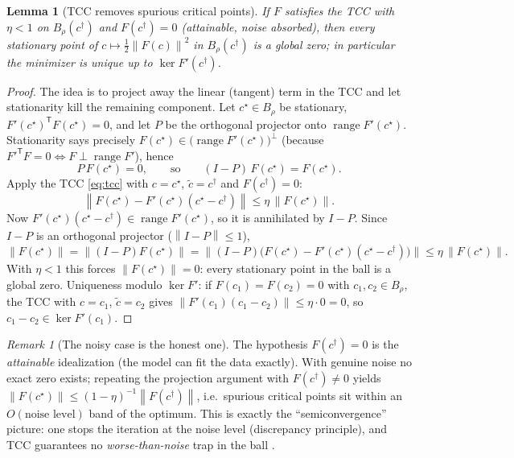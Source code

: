 \documentclass[11pt]{article}
\theoremstyle{plain}
\newtheorem{lemma}[theorem]{Lemma}
\theoremstyle{definition}
\theoremstyle{remark}
\newtheorem*{remark}{Remark}
\newcommand{\norm}[1]{\left\lVert#1\right\rVert}
\newcommand{\trc}{\mathsf{T}}
\begin{document}
\begin{lemma}[TCC removes spurious critical points]\label{lem:tcc}
If $F$ satisfies the TCC with $\eta<1$ on $B_\rho(c^\dagger)$ and
$F(c^\dagger)=0$ (attainable, noise absorbed), then every stationary
point of $c\mapsto\tfrac12\norm{F(c)}^{2}$ in $B_\rho(c^\dagger)$ is a
global zero; in particular the minimizer is unique up to
$\ker F'(c^\dagger)$.
\end{lemma}

\begin{proof}
The idea is to project away the linear (tangent) term in the TCC and let
stationarity kill the remaining component. Let $c^\star\in B_\rho$ be
stationary, $F'(c^\star)^{\trc}F(c^\star)=0$, and let $P$ be the
orthogonal projector onto $\operatorname{range}F'(c^\star)$. Stationarity
says precisely $F(c^\star)\in\big(\operatorname{range}F'(c^\star)\big)^{
\perp}$ (because $F'^{\trc}F=0\iff F\perp\operatorname{range}F'$), hence
\[
P\,F(c^\star)=0,\qquad\text{so}\qquad (I-P)\,F(c^\star)=F(c^\star).
\]
Apply the TCC \eqref{eq:tcc} with $c=c^\star$, $\tilde c=c^\dagger$ and
$F(c^\dagger)=0$:
\[
\norm{F(c^\star)-F'(c^\star)(c^\star-c^\dagger)}\le
\eta\,\norm{F(c^\star)} .
\]
Now $F'(c^\star)(c^\star-c^\dagger)\in\operatorname{range}F'(c^\star)$,
so it is annihilated by $I-P$. Since $I-P$ is an orthogonal projector
($\norm{I-P}\le1$),
\[
\norm{F(c^\star)}
=\norm{(I-P)F(c^\star)}
=\big\|(I-P)\big(F(c^\star)-F'(c^\star)(c^\star-c^\dagger)\big)\big\|
\le\eta\,\norm{F(c^\star)} .
\]
With $\eta<1$ this forces $\norm{F(c^\star)}=0$: every stationary point
in the ball is a global zero. Uniqueness modulo $\ker F'$: if
$F(c_1)=F(c_2)=0$ with $c_1,c_2\in B_\rho$, the TCC with $c=c_1$,
$\tilde c=c_2$ gives $\norm{F'(c_1)(c_1-c_2)}\le\eta\cdot0=0$, so
$c_1-c_2\in\ker F'(c_1)$.
\end{proof}

\begin{remark}[The noisy case is the honest one]
The hypothesis $F(c^\dagger)=0$ is the \emph{attainable} idealization
(the model can fit the data exactly). With genuine noise no exact zero
exists; repeating the projection argument with $F(c^\dagger)\neq0$ yields
$\norm{F(c^\star)}\le(1-\eta)^{-1}\norm{F(c^\dagger)}$, i.e.\ spurious
critical points sit within an $O(\text{noise level})$ band of the
optimum. This is exactly the ``semiconvergence'' picture: one stops the
iteration at the noise level (discrepancy principle), and TCC guarantees
no \emph{worse-than-noise} trap in the ball \cite{kaltenbacher2008}.
\end{remark}
\end{document}
